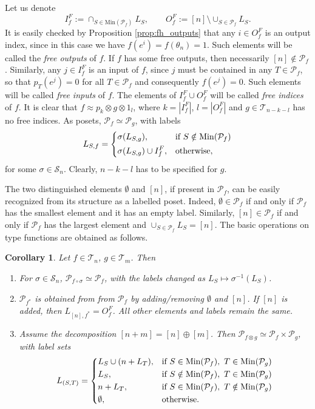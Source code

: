 \documentclass[12pt]{article}
\newtheorem{coro}{Corollary}
\theoremstyle{definition}
\theoremstyle{remark}
\def\Te{\mathcal T}
\def\Pe{\mathcal P}
\def\permut{\mathscr{S}}
\begin{document}
\medskip
Let us denote
\[
I_f^F:=\cap_{S\in \mathrm{Min}(\Pe_f)} L_S, \qquad O_f^F:=[n]\setminus
\cup_{S\in \Pe_f}L_S.
\]
It is easily checked by Proposition \ref{prop:fh_outputs} that any  $i\in O_f^F$ is an
output index, since in this case  we have
$f(e^i)=f(\theta_n)=1$. Such elements will be called
the {\em free outputs} of $f$. If $f$ has some free outputs, then necessarily $[n]\notin
\Pe_f$. Similarly, any  $j\in I_f^F$ is an input of $f$, since $j$ must be
contained in any $T\in \Pe_f$, so that $p_T(e^j)=0$ for all $T\in \Pe_f$ and consequently
$f(e^j)=0$. Such elements will be called {\em free
inputs} of $f$. The elements of $I_f^F\cup O_f^F$ will be called {\em free indices} of
$f$.  It is clear that $f\approx p_k\otimes g\otimes
1_l$, where
$k=|I_f^F|$, $l=|O_f^F|$  and $g\in \Te_{n-k-l}$ has no free indices. As posets,
$\Pe_f\simeq \Pe_g$,  with labels
\[
L_{S,f}=\begin{dcases} \sigma(L_{S,g}), &\text{if } S\notin \mathrm{Min}(\Pe_f)\\
\sigma(L_{S,g})\cup I^F_f, &\text {otherwise},
\end{dcases}
\]
for some $\sigma\in \permut_n$. Clearly, $n-k-l$ has to be specified for $g$. 



The  two distinguished elements $\emptyset$ and $[n]$, if present in $\Pe_f$, can be easily recognized
from its structure as a labelled poset. Indeed, $\emptyset\in \Pe_f$ if and only if
$\Pe_f$ has the  smallest element and it  has an empty label. 
Similarly, $[n]\in \Pe_f$ if and
only if $\Pe_f$ has  the largest element and $\cup_{S\in \Pe_f}L_S=[n]$. The basic operations on
type functions are obtained as follows. 

\begin{coro}\label{coro:Pf} Let $f\in \Te_n$, $g\in \Te_m$. Then
\begin{enumerate}
\item[(i)] For $\sigma\in \permut_n$,  $\Pe_{f\circ\sigma}\simeq \Pe_f$, with the labels
changed as $L_S\mapsto \sigma^{-1}(L_S)$.

\item[(ii)] $\Pe_{f^*}$ is obtained from from $\Pe_f$ by adding/removing $\emptyset$ and
$[n]$. If $[n]$ is added, then  $L_{[n],f^*}=O_f^F$.  All other elements and labels remain the same. 
\item[(iii)] Assume the decomposition $[n+m]=[n]\oplus[m]$. Then 
$\Pe_{f\otimes g}\simeq \Pe_f\times \Pe_g$, with label sets
\[
L_{(S,T)}=\begin{dcases} L_S\cup (n+L_T), & \text{if } S\in \mathrm{Min}(\Pe_f),\ T\in
\mathrm{Min}(\Pe_g)\\
L_S, & \text{if } S\notin \mathrm{Min}(\Pe_f),\ T\in
\mathrm{Min}(\Pe_g)\\
n+ L_T, &\text{if }S \in \mathrm{Min}(\Pe_f),\ T\notin
\mathrm{Min}(\Pe_g)\\
\emptyset, & \text{otherwise}.
\end{dcases}
\]



\end{enumerate}


\end{coro}
\end{document}
